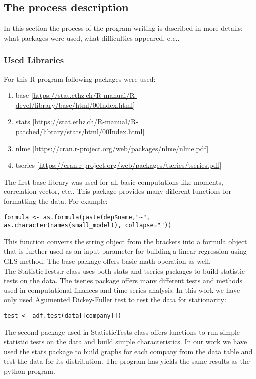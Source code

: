 \documentclass{article}
\begin{document}
\subsection{The process description}
In this section the process of the program writing is described in more details: what packages were used, what difficulties appeared, etc..
\subsubsection{Used Libraries}
For this R program following packages were used:
\begin{enumerate}
    \item base [\url{https://stat.ethz.ch/R-manual/R-devel/library/base/html/00Index.html}]
    \item stats [\url{https://stat.ethz.ch/R-manual/R-patched/library/stats/html/00Index.html}]
    \item nlme [https://cran.r-project.org/web/packages/nlme/nlme.pdf]
    \item tseries [\url{https://cran.r-project.org/web/packages/tseries/tseries.pdf}]
\end{enumerate}
The first base library was used for all basic computations like moments, correlation vector, etc.. This package provides many different functions for formatting the data. For example:
\begin{verbatim}
formula <- as.formula(paste(dep$name,"~", as.character(names(small_model)), collapse=""))
\end{verbatim}
This function converts the string object from the brackets into a formula object that is further used as an input parameter for building a linear regression using GLS method. The base package offers basic math operation as well.\\
The StatisticTests.r class uses both stats and tseries packages to build statistic tests on the data. The tseries package offers many different tests and methods used in computational finances and time series analysis. In this work we have only used Agumented Dickey-Fuller test to test the data for stationarity:
\begin{verbatim}
test <- adf.test(data[[company]])
\end{verbatim}
The second package used in StatisticTests class offers functions to run simple statistic tests on the data and build simple characteristics. In our work we have used the stats package to build graphs for each company from the data table and test the data for its distribution. The program has yields the same results as the python program.\\
\end{document}
